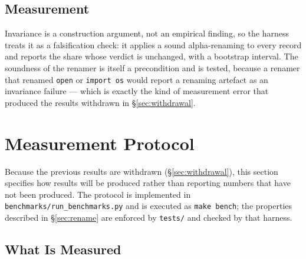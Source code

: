 \documentclass[12pt,a4paper]{article}
\begin{document}
\subsection{Measurement}

Invariance is a construction argument, not an empirical finding, so the harness
treats it as a falsification check: it applies a sound alpha-renaming to every
record and reports the share whose verdict is unchanged, with a bootstrap
interval. The soundness of the renamer is itself a precondition and is tested,
because a renamer that renamed \texttt{open} or \texttt{import os} would report a
renaming artefact as an invariance failure --- which is exactly the kind of
measurement error that produced the results withdrawn in \S\ref{sec:withdrawal}.

\section{Measurement Protocol}
\label{sec:measure}

Because the previous results are withdrawn (\S\ref{sec:withdrawal}), this section
specifies how results will be produced rather than reporting numbers that have
not been produced. The protocol is implemented in
\texttt{benchmarks/run\_benchmarks.py} and is executed as
\texttt{make bench}; the properties described in \S\ref{sec:rename} are enforced by
\texttt{tests/} and checked by that harness.

\subsection{What Is Measured}
\end{document}
